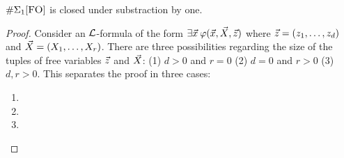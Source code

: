 \begin{theo}
$\E1$ is closed under substraction by one.
\end{theo}
\begin{proof}
Consider an ${\cal L}$-formula of the form $\exists\vec{x}\:\varphi(\vec{x},\vec{X},\vec{z})$ where $\vec{z} = (z_1,\dots,z_d)$ and $\vec{X} = (X_1,\dots,X_r)$. There are three possibilities regarding the size of the tuples of free variables $\vec{z}$ and $\vec{X}$: (1) $d>0$ and $r=0$ (2) $d=0$ and $r>0$ (3) $d,r>0$. This separates the proof in three cases:
\begin{enumerate}
\item 

\item 




\item 
\end{enumerate}
\end{proof}